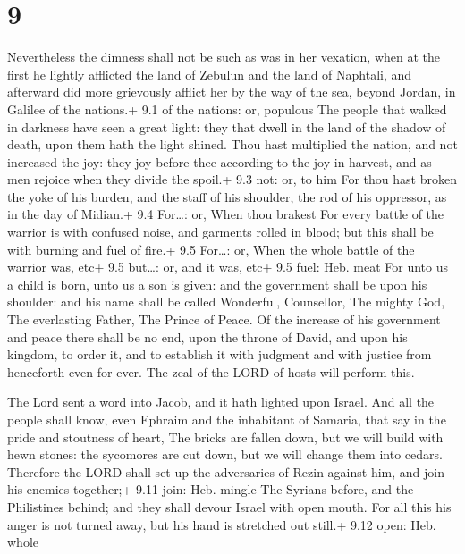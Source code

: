 \hypertarget{section-8}{%
\section{9}\label{section-8}}

 Nevertheless the dimness shall not be such as was in her
vexation, when at the first he lightly afflicted the land of Zebulun and
the land of Naphtali, and afterward did more grievously afflict her by
the way of the sea, beyond Jordan, in Galilee of the nations.+ 9.1 of
the nations: or, populous  The people that walked in
darkness have seen a great light: they that dwell in the land of the
shadow of death, upon them hath the light shined.  Thou hast
multiplied the nation, and not increased the joy: they joy before thee
according to the joy in harvest, and as men rejoice when they divide the
spoil.+ 9.3 not: or, to him  For thou hast broken the yoke
of his burden, and the staff of his shoulder, the rod of his oppressor,
as in the day of Midian.+ 9.4 For\ldots: or, When thou brakest
 For every battle of the warrior is with confused noise, and
garments rolled in blood; but this shall be with burning and fuel of
fire.+ 9.5 For\ldots: or, When the whole battle of the warrior was, etc+
9.5 but\ldots: or, and it was, etc+ 9.5 fuel: Heb. meat  For
unto us a child is born, unto us a son is given: and the government
shall be upon his shoulder: and his name shall be called Wonderful,
Counsellor, The mighty God, The everlasting Father, The Prince of Peace.
 Of the increase of his government and peace there shall be
no end, upon the throne of David, and upon his kingdom, to order it, and
to establish it with judgment and with justice from henceforth even for
ever. The zeal of the LORD of hosts will perform this.

 The Lord sent a word into Jacob, and it hath lighted upon
Israel.  And all the people shall know, even Ephraim and the
inhabitant of Samaria, that say in the pride and stoutness of heart,
 The bricks are fallen down, but we will build with hewn
stones: the sycomores are cut down, but we will change them into cedars.
 Therefore the LORD shall set up the adversaries of Rezin
against him, and join his enemies together;+ 9.11 join: Heb. mingle
 The Syrians before, and the Philistines behind; and they
shall devour Israel with open mouth. For all this his anger is not
turned away, but his hand is stretched out still.+ 9.12 open: Heb. whole

